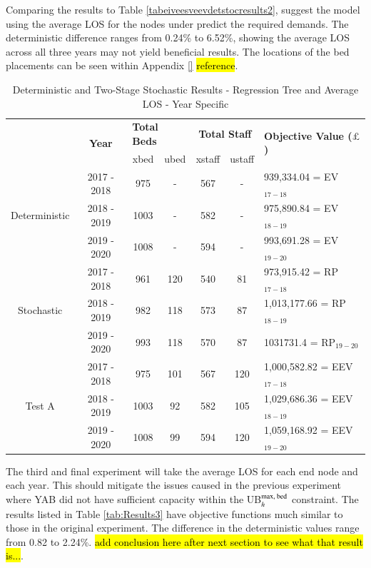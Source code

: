 \documentclass[../thesis.tex]{subfiles}
\begin{document}
Comparing the results to Table \ref{tabeiveesveevdetstocresults2}, suggest the model using the average LOS for the nodes under predict the required demands. The deterministic difference ranges from 0.24\% to 6.52\%, showing the average LOS across all three years may not yield beneficial results. The locations of the bed placements can be seen within Appendix \ref{} \hl{reference}.



\begin{table}[h!]
    \centering
    \begin{tabular}{ccccccl}\toprule
 & \multirow{2}{*}{\textbf{Year}}& \multicolumn{2}{l}{\textbf{Total Beds}} & \multicolumn{2}{c}{\textbf{Total Staff}} & \multirow{2}{*}{\textbf{Objective Value ($\pounds$)}}\\ \cmidrule(lr){3-4} \cmidrule(lr){5-6}
&& xbed           & ubed          & xstaff         & ustaff         \\ \midrule
     \multirow{3}{*}{Deterministic} & 2017 - 2018 & 975  & - & 567  & - &  939,334.04 =  EV$_{17-18}$ \\ 
      & 2018 - 2019 &1003 & - & 582 & - & 975,890.84 =  EV$_{18-19}$ \\
      & 2019 - 2020 & 1008 & - & 594 & - &  993,691.28 =  EV$_{19-20}$\\ \midrule
     \multirow{3}{*}{Stochastic} & 2017 - 2018 & 961 & 120 & 540 & 81 & 973,915.42 =  RP$_{17-18}$ \\ 
      & 2018 - 2019 & 982 &  118 & 573 & 87 & 1,013,177.66 =  RP$_{18-19}$ \\
      & 2019 - 2020 &993 & 118 &570 &87 & 1031731.4 =  RP$_{19-20}$\\ \midrule    
     \multirow{3}{*}{Test A} & 2017 - 2018 & 975 & 101 &  567 & 120 & 1,000,582.82
=  EEV$_{17-18}$ \\ 
      & 2018 - 2019& 1003 & 92& 582 & 105 &1,029,686.36 =  EEV$_{18-19}$ \\
      & 2019 - 2020 & 1008 & 99 & 594 &120 & 1,059,168.92 =  EEV$_{19-20}$\\ \bottomrule       
    \end{tabular}
    \caption{Deterministic and Two-Stage Stochastic Results - Regression Tree and Average LOS - Year Specific}
    \label{tab:Results2}
\end{table}


The third and final experiment will take the average LOS for each end node and each year. This should mitigate the issues caused in the previous experiment where YAB did not have sufficient capacity within the UB$_{h}^{\textnormal{max, bed}}$ constraint. The results listed in Table \ref{tab:Results3} have objective functions much similar to those in the original experiment. The difference in the deterministic values range from 0.82 to 2.24\%. \hl{add conclusion here after next section to see what that result is...}. 
\end{document}
